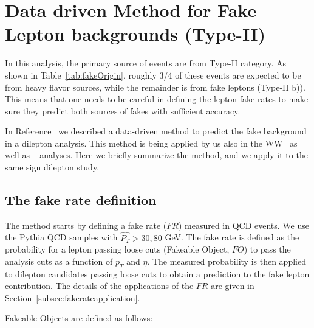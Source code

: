 \section{Data driven Method for Fake Lepton backgrounds (Type-II)}
\label{sec:leptonfake}

In this analysis, the primary source of events are from Type-II category. 
As shown in Table~\ref{tab:fakeOrigin}, roughly 3/4 of these events are expected to be from 
heavy flavor sources, while the remainder is from
fake leptons (Type-II b)). This means that one needs to be careful in defining the lepton fake rates
to make sure they predict both sources of fakes with sufficient accuracy.

In Reference~\cite{fakelep} we described a data-driven method to predict the fake 
background in a dilepton analysis. This method is being applied by us also 
in the WW~\cite{ww} as well as \ttbar ~\cite{ttbar} analyses. Here we briefly
summarize the method, and we apply it to the same sign dilepton study.

\subsection{The fake rate definition}
\label{subsec:fakeratedef}

The method starts by defining a fake rate ($FR$) measured in QCD events. We use 
the Pythia QCD samples with $\hat{P_T} > 30, 80 $ GeV. The fake rate is defined as 
the probability for a lepton passing loose cuts (Fakeable Object, $FO$) to pass the 
analysis cuts as a function of $p_T$ and $\eta$. The measured probability is then applied to 
dilepton candidates passing loose cuts to obtain a prediction to the fake lepton contribution. 
The details of the applications of the $FR$ are given in Section~\ref{subsec:fakerateapplication}. 

Fakeable Objects are defined as follows:


